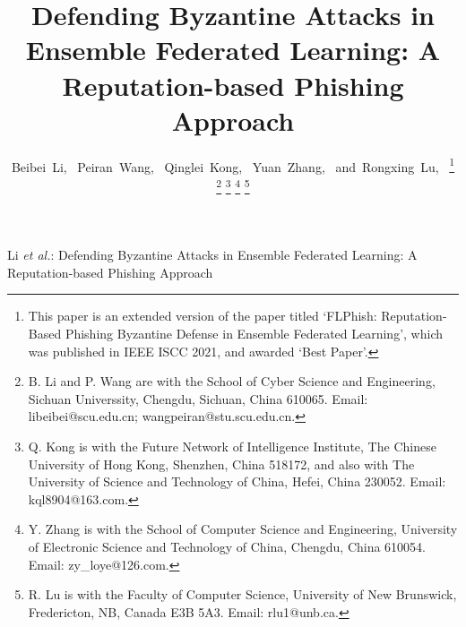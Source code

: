 \documentclass[lettersize,journal]{IEEEtran}
\begin{document}
\title{Defending Byzantine Attacks in Ensemble Federated Learning: A Reputation-based Phishing Approach}
\author{Beibei~Li,~
        Peiran~Wang,~
        Qinglei~Kong,~
        Yuan~Zhang,~
        and~Rongxing~Lu,~
\thanks{This paper is an extended version of the paper titled `FLPhish: Reputation-Based Phishing Byzantine Defense in Ensemble Federated Learning', which was published in IEEE ISCC 2021, and awarded `Best Paper'.}
\thanks{B. Li and P. Wang are with the School of Cyber Science and Engineering, Sichuan Universsity, Chengdu, Sichuan, China 610065. Email: libeibei@scu.edu.cn; wangpeiran@stu.scu.edu.cn.}
\thanks{Q. Kong is with the Future Network of Intelligence Institute, The Chinese University of Hong Kong, Shenzhen, China 518172, and also with The University of Science and Technology of China, Hefei, China 230052. Email: kql8904@163.com.}
\thanks{Y. Zhang is with the School of Computer Science and Engineering, University of Electronic Science and Technology of China, Chengdu, China 610054. Email: zy\_loye@126.com.}
\thanks{R. Lu is with the Faculty of Computer Science, University of New Brunswick, Fredericton, NB, Canada E3B 5A3. Email: rlu1@unb.ca.}
}

%
{Li \MakeLowercase{\textit{et al.}}: Defending Byzantine Attacks in Ensemble Federated Learning: A Reputation-based Phishing Approach}


\maketitle
\end{document}
